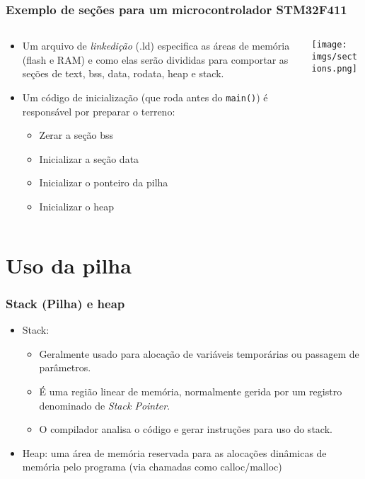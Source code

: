 \documentclass{beamer}
\begin{document}
\begin{frame}
	\frametitle{Exemplo de seções para um microcontrolador STM32F411}
	\begin{columns}[T] %
	\begin{column}{.60\textwidth}
	\begin{itemize}
		\item Um arquivo de \textit{linkedição} (.ld) especifica as áreas de memória (flash e RAM) e como elas serão divididas para comportar as seções de text, bss, data, rodata, heap e stack.
        \item Um código de inicialização (que roda antes do \texttt{main()}) é responsável por preparar o terreno:
        	\begin{itemize}
        		\item Zerar a seção bss
                \item Inicializar a seção data
                \item Inicializar o ponteiro da pilha
                \item Inicializar o heap
        	\end{itemize}
	\end{itemize}
	\end{column}%
	\hfill%
	\begin{column}{.40\textwidth}
        \texttt{[image: imgs/sections.png]}
	\end{column}%
\end{columns}
\end{frame}

\section{Uso da pilha}

\begin{frame}
	\frametitle{Stack (Pilha) e heap}
	\begin{itemize}
	\item Stack:
	\begin{itemize}
		\item Geralmente usado para alocação de variáveis temporárias ou passagem de parâmetros.
		\item É uma região linear de memória, normalmente gerida por um registro denominado de \textit{Stack Pointer}.
		\item O compilador analisa o código e gerar instruções para uso do stack.
	\end{itemize}
	\item Heap: uma área de memória reservada para as alocações dinâmicas de memória pelo programa (via chamadas como calloc/malloc)
	\end{itemize}
\end{frame}
\end{document}
